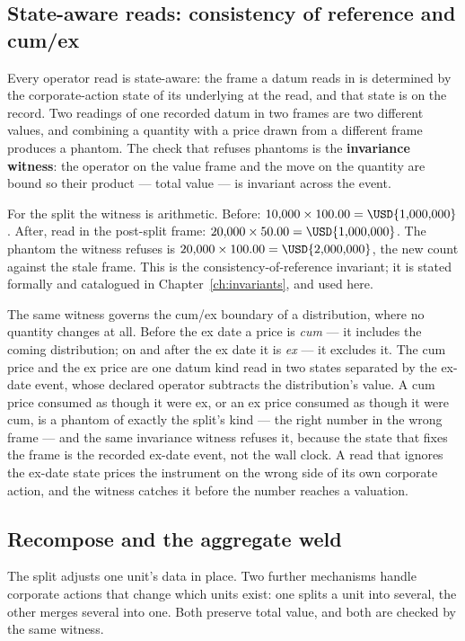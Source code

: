 \subsection{State-aware reads: consistency of reference and cum/ex}\label{sec:witness}

Every operator read is state-aware: the frame a datum reads in is determined by the
corporate-action state of its underlying at the read, and that state is on the record. Two
readings of one recorded datum in two frames are two different values, and combining a
quantity with a price drawn from a different frame produces a phantom. The check that
refuses phantoms is the \textbf{invariance witness}: the operator on the value frame and
the move on the quantity are bound so their product --- total value --- is invariant across
the event.

For the split the witness is arithmetic. Before: $10{,}000 \times 100.00 = \USD{1{,}000{,}000}$.
After, read in the post-split frame: $20{,}000 \times 50.00 = \USD{1{,}000{,}000}$. The
phantom the witness refuses is $20{,}000 \times 100.00 = \USD{2{,}000{,}000}$, the new count
against the stale frame. This is the consistency-of-reference invariant; it is stated
formally and catalogued in Chapter~\ref{ch:invariants}, and used here.

The same witness governs the cum/ex boundary of a distribution, where no quantity changes
at all. Before the ex date a price is \emph{cum} --- it includes the coming distribution;
on and after the ex date it is \emph{ex} --- it excludes it. The cum price and the ex price
are one datum kind read in two states separated by the ex-date event, whose declared
operator subtracts the distribution's value. A cum price consumed as though it were ex, or
an ex price consumed as though it were cum, is a phantom of exactly the split's kind ---
the right number in the wrong frame --- and the same invariance witness refuses it, because
the state that fixes the frame is the recorded ex-date event, not the wall clock. A read
that ignores the ex-date state prices the instrument on the wrong side of its own corporate
action, and the witness catches it before the number reaches a valuation.

\subsection{Recompose and the aggregate weld}\label{sec:recompose}

The split adjusts one unit's data in place. Two further mechanisms handle corporate actions
that change which units exist: one splits a unit into several, the other merges several into
one. Both preserve total value, and both are checked by the same witness.

